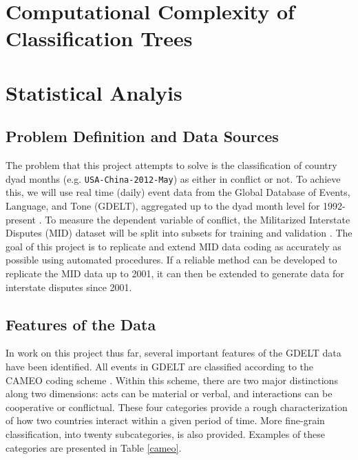 \documentclass[12pt,letterpaper]{article}
\begin{document}
\section{Computational Complexity of Classification Trees}
\label{complexity}



\section{Statistical Analyis}
\label{analysis}

\subsection{Problem Definition and Data Sources}

The problem that this project attempts to solve is the classification of country dyad months (e.g. \texttt{USA-China-2012-May}) as either in conflict or not. To achieve this, we will use real time (daily) event data from the Global Database of Events, Language, and Tone (GDELT), aggregated up to the dyad month level for 1992-present \citep{schrodt2013gdelt}. To measure the dependent variable of conflict, the Militarized Interstate Disputes (MID) dataset will be split into subsets for training and validation \citep{ghosn2004mid3}. The goal of this project is to replicate and extend MID data coding as accurately as possible using automated procedures. If a reliable method can be developed to replicate the MID data up to 2001, it can then be extended to generate data for interstate disputes since 2001. 


\subsection{Features of the Data}

In work on this project thus far, several important features of the GDELT data have been identified. All events in GDELT are classified according to the CAMEO coding scheme \citep{gerner:etal:2002}. Within this scheme, there are two major distinctions along two dimensions: acts can be material or verbal, and interactions can be cooperative or conflictual. These four categories provide a rough characterization of how two countries interact within a given period of time. More fine-grain classification, into twenty subcategories, is also provided. Examples of these categories are presented in Table \ref{cameo}.
\end{document}
